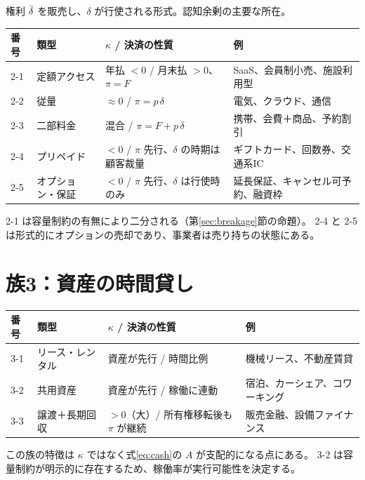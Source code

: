 権利 $\dbar$ を販売し、$\delta$ が行使される形式。認知余剰の主要な所在。

\begin{center}
\begin{tabularx}{\textwidth}{@{}llXX@{}}
\toprule
番号 & 類型 & $\kappa$ / 決済の性質 & 例 \\
\midrule
2-1 & 定額アクセス & 年払 $<0$ / 月末払 $>0$、$\pi=F$ & SaaS、会員制小売、施設利用型 \\
2-2 & 従量 & $\approx 0$ / $\pi = p\,\delta$ & 電気、クラウド、通信 \\
2-3 & 二部料金 & 混合 / $\pi = F + p\,\delta$ & 携帯、会費＋商品、予約割引 \\
2-4 & プリペイド & $<0$ / $\pi$ 先行、$\delta$ の時期は顧客裁量 & ギフトカード、回数券、交通系IC \\
2-5 & オプション・保証 & $<0$ / $\pi$ 先行、$\delta$ は行使時のみ & 延長保証、キャンセル可予約、融資枠 \\
\bottomrule
\end{tabularx}
\label{tab:family-2-catalog}
\end{center}

2-1 は容量制約の有無により二分される（第\ref{sec:breakage}節の命題）。
2-4 と 2-5 は形式的にオプションの売却であり、事業者は売り持ちの状態にある。

\section{族3：資産の時間貸し}

\begin{center}
\begin{tabularx}{\textwidth}{@{}llXX@{}}
\toprule
番号 & 類型 & $\kappa$ / 決済の性質 & 例 \\
\midrule
3-1 & リース・レンタル & 資産が先行 / 時間比例 & 機械リース、不動産賃貸 \\
3-2 & 共用資産 & 資産が先行 / 稼働に連動 & 宿泊、カーシェア、コワーキング \\
3-3 & 譲渡＋長期回収 & $>0$（大）/ 所有権移転後も $\pi$ が継続 & 販売金融、設備ファイナンス \\
\bottomrule
\end{tabularx}
\label{tab:family-3-catalog}
\end{center}

この族の特徴は $\kappa$ ではなく式\eqref{eq:cash}の $A$ が支配的になる点にある。
3-2 は容量制約が明示的に存在するため、稼働率が実行可能性を決定する。

